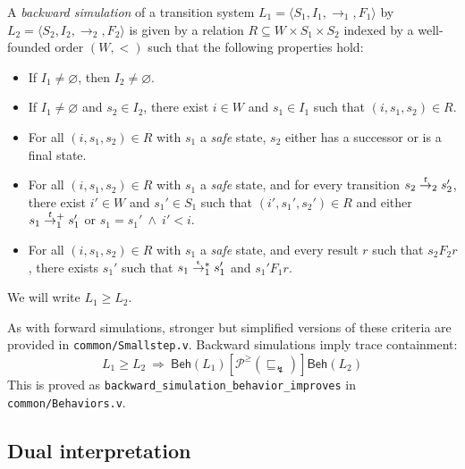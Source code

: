 \documentclass[sigplan,10pt,review,anonymous]{acmart}
\newcommand{\kw}[1]{\ensuremath{ \mathsf{#1} }}
\newcommand{\refby}{\sqsubseteq}
\newcommand{\ifr}[1]{\mathrel{[{#1}]}}
\begin{document}
\begin{definition} %
A \emph{backward simulation}
of a transition system
$L_1 = \langle S_1, I_1, {\rightarrow}_1, F_1 \rangle$
by
$L_2 = \langle S_2, I_2, {\rightarrow}_2, F_2 \rangle$
is given by a relation $R \subseteq W \times S_1 \times S_2$
indexed by a well-founded order $(W, {<})$
such that the following properties hold:
\begin{itemize}
  \item If $I_1 \ne \varnothing$, then $I_2 \ne \varnothing$.
  \item If $I_1 \ne \varnothing$ and $s_2 \in I_2$,
    there exist $i \in W$ and $s_1 \in I_1$
    such that $(i, s_1, s_2) \in R$.
  \item For all $(i, s_1, s_2) \in R$
    with $s_1$ a \emph{safe} state,
    $s_2$ either has a successor or
    is a final state.
  \item For all $(i, s_1, s_2) \in R$
    with $s_1$ a \emph{safe} state,
    and for every transition
    $s_2 \mathrel{\smash{\stackrel{t}{\rightarrow}}_2} s_2'$,
    there exist $i' \in W$ and $s_1' \in S_1$
    such that $(i', s_1', s_2') \in R$ and either
    $s_1 \mathrel{\smash{\stackrel{t}{\rightarrow}}_1^+} s_1'$ or
    $s_1 = s_1' \:\wedge\: i' < i$.
  \item For all $(i, s_1, s_2) \in R$
    with $s_1$ a \emph{safe} state,
    and every result $r$ such that $s_2 \mathrel{F_2} r$,
    there exists $s_1'$ such that
    $s_1 \mathrel{\smash{\stackrel{\epsilon}{\rightarrow}}_1^*} s_1'$ and
    $s_1' \mathrel{F_1} r$.
\end{itemize}
We will write $L_1 \ge L_2$.
\end{definition}

As with forward simulations,
stronger but simplified versions
of these criteria
are provided in \texttt{common/Smallstep.v}.
Backward simulations imply trace containment:
\[
  L_1 \ge L_2
  \: \Rightarrow \:
  \kw{Beh}(L_1) \ifr{\mathcal{P}^\ge(\refby_\lightning)} \kw{Beh}(L_2)
\]
This is proved as \texttt{backward\_simulation\_behavior\_improves}
in \texttt{common/Behaviors.v}.


\subsection{Dual interpretation} %
\end{document}
